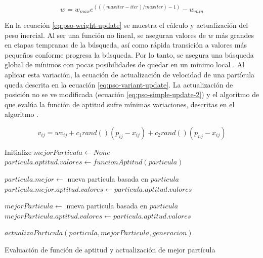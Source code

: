 \documentclass[letterpaper]{report}
\begin{document}
    \begin{equation}
      \label{eq:pso-weight-update}
      w = w_{max} e^{(((maxiter - iter) / maxiter) - 1)} - w_{min} 
    \end{equation}

    En la ecuación \ref{eq:pso-weight-update} se muestra el cálculo y
    actualización del peso inercial. Al ser una función no lineal, se aseguran
    valores de $w$ más grandes en etapas tempranas de la búsqueda, así como
    rápida transición a valores más pequeños conforme progresa la búsqueda. Por
    lo tanto, se asegura una búsqueda global de mínimos con pocas posibilidades
    de quedar en un mínimo local \cite{APSO2016}. Al aplicar esta variación, la
    ecuación de actualización de velocidad de una partícula queda descrita en
    la ecuación \ref{eq:pso-variant-update}. La actualización de posición no se
    ve modificada (ecuación \ref{eq:pso-simple-update-2}) y el algoritmo de
    que evalúa la función de aptitud sufre mínimas variaciones, descritas
    en el algoritmo \cite{}.

    \begin{equation}
      v_{ij} = w v_{ij} + c_1 rand()(p_{ij} - x_{ij}) + c_2 rand()(p_{nj}
        - x_{ij})
      \label{eq:pso-variant-update}
    \end{equation}

    \begin{algorithm}
      \begin{algorithmic}
        \State Initialize $mejorParticula \gets None$
            \State $particula.aptitud.valores \gets funcionAptitud(particula)$

              \State $particula.mejor \gets$ nueva particula basada en $particula$
              \State $particula.mejor.aptitud.valores \gets particula.aptitud.valores$
            \EndIf

              \State $mejorParticula \gets$ nueva particula basada en $particula$
              \State $mejorParticula.aptitud.valores \gets particula.aptitud.valores$
            \EndIf
          \EndFor 

            \State $actualizaParticula(particula, mejorParticula, generacion)$
          \EndFor
        \EndFor
        \caption{Evaluación de función de aptitud y actualización de mejor
          partícula}
        \label{alg:pso-simple-eval-1}
      \end{algorithmic}
    \end{algorithm}
\end{document}
